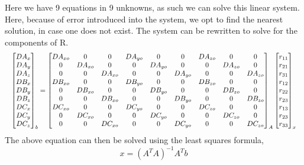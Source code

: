\documentclass[a4paper]{article}
\begin{document}
Here we have 9 equations in 9 unknowns, as such we can solve this linear system. Here, because of error introduced into the system, we opt to find the nearest solution, in case one does not exist. The system can be rewritten to solve for the components of R.
\begin{equation}
\resizebox{\linewidth}{!}{$
\begin{bmatrix}
DA_x \\DA_y \\DA_z \\DB_x \\DB_y \\DB_z \\DC_x \\DC_y \\DC_z 
\end{bmatrix}_b = 
\begin{bmatrix}
DA_{xo} & 0      & 0      & DA_{yo}& 0      & 0      & DA_{zo}& 0      & 0      \\
0       & DA_{xo}& 0      & 0      & DA_{yo}& 0      & 0      & DA_{zo}& 0      \\
0       & 0      & DA_{xo}& 0      & 0      & DA_{yo}& 0      & 0      & DA_{zo}\\
DB_{xo} & 0      & 0      & DB_{yo}& 0      & 0      & DB_{zo}& 0      & 0      \\
0       & DB_{xo}& 0      & 0      & DB_{yo}& 0      & 0      & DB_{zo}& 0      \\
0       & 0      & DB_{xo}& 0      & 0      & DB_{yo}& 0      & 0      & DB_{zo}\\
DC_{xo} & 0      & 0      & DC_{yo}& 0      & 0      & DC_{zo}& 0      & 0      \\
0       & DC_{xo}& 0      & 0      & DC_{yo}& 0      & 0      & DC_{zo}& 0      \\
0       & 0      & DC_{xo}& 0      & 0      & DC_{yo}& 0      & 0      & DC_{zo}
\end{bmatrix}_A
\begin{bmatrix}
r_{11}\\ r_{21}\\ r_{31}\\ 
r_{12}\\ r_{22}\\ r_{23}\\
r_{13}\\ r_{23}\\ r_{33}
\end{bmatrix}_x $}
\end{equation}
The above equation can then be solved using the least squares formula,
\begin{equation}
x = (A^T A)^{-1} A^T b
\end{equation}
\end{document}

